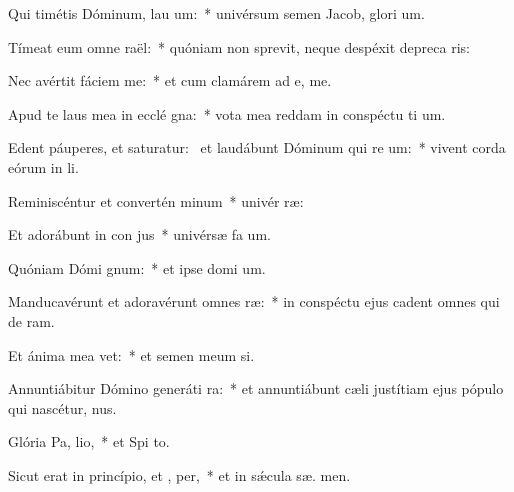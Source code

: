 \item Qui timétis Dóminum, lau um:~* univérsum semen Jacob, glori um.
\item Tímeat eum omne  raël:~* quóniam non sprevit, neque despéxit depreca ris:
\item Nec avértit fáciem   me:~* et cum clamárem ad e,  me.
\item Apud te laus mea in ecclé gna:~* vota mea reddam in conspéctu ti um.
\item Edent páuperes, et saturatur:~\pscross{} et laudábunt Dóminum qui re um:~* vivent corda eórum in  li.
\item Reminiscéntur et convertén  minum~* univér  ræ:
\item Et adorábunt in con jus~* univérsæ fa um.
\item Quóniam Dómi  gnum:~* et ipse domi um.
\item Manducavérunt et adoravérunt omnes  ræ:~* in conspéctu ejus cadent omnes qui de  ram.
\item Et ánima mea  vet:~* et semen meum  si.
\item Annuntiábitur Dómino generáti ra:~* et annuntiábunt cæli justítiam ejus pópulo qui nascétur,   nus.
\item Glória Pa,  lio,~* et Spi to.
\item Sicut erat in princípio, et ,  per,~* et in sǽcula sæ. men.
